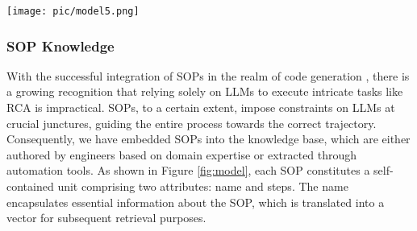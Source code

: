 
\begin{figure*}[htbp]
\centerline{\texttt{[image: pic/model5.png]}}
\caption{Comparison of ReAct and Flow-of-Action. RC means root cause. Dashed lines represent paths triggered under specific conditions. When the previous action is $match\_observation$, JudgeAgent and ObAgent are triggered. When JudgeAgent finds the root cause, it triggers the input of the analysis result to thought and adds $Speak$ to action set.}
\label{fig:model}
\end{figure*}

\subsubsection{SOP Knowledge}



With the successful integration of SOPs in the realm of code generation \citep{hong2023metagpt}, there is a growing recognition that relying solely on LLMs to execute intricate tasks like RCA is impractical. SOPs, to a certain extent, impose constraints on LLMs at crucial junctures, guiding the entire process towards the correct trajectory. Consequently, we have embedded SOPs into the knowledge base, which are either authored by engineers based on domain expertise or extracted through automation tools. As shown in Figure \ref{fig:model}, each SOP constitutes a self-contained unit comprising two attributes: name and steps. The name encapsulates essential information about the SOP, which is translated into a vector for subsequent retrieval purposes.

